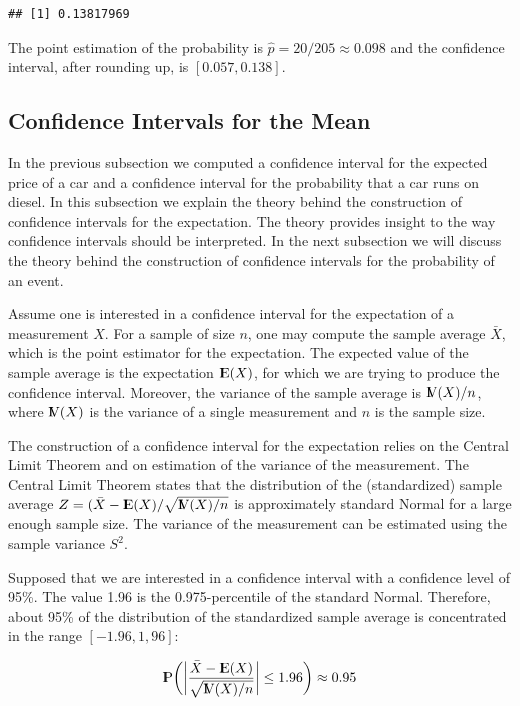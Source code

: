 \documentclass[]{krantz}
\newcommand{\Expec}{{\rm I\kern-.3em E}}
\newcommand{\Prob}{{\rm I\kern-.3em P}}
\newcommand{\Var}{{\rm I\kern-.3em V}}
\theoremstyle{definition}
\theoremstyle{definition}
\theoremstyle{definition}
\theoremstyle{remark}
\begin{document}
\begin{verbatim}
## [1] 0.13817969
\end{verbatim}

The point estimation of the probability is
\(\hat p = 20/205 \approx 0.098\) and the confidence interval, after
rounding up, is \([0.057, 0.138]\).

\hypertarget{subsec:CImean}{%
\subsection{Confidence Intervals for the Mean}\label{subsec:CImean}}

In the previous subsection we computed a confidence interval for the
expected price of a car and a confidence interval for the probability
that a car runs on diesel. In this subsection we explain the theory
behind the construction of confidence intervals for the expectation. The
theory provides insight to the way confidence intervals should be
interpreted. In the next subsection we will discuss the theory behind
the construction of confidence intervals for the probability of an
event.

Assume one is interested in a confidence interval for the expectation of
a measurement \(X\). For a sample of size \(n\), one may compute the sample
average \(\bar X\), which is the point estimator for the expectation. The
expected value of the sample average is the expectation \(\Expec(X)\), for
which we are trying to produce the confidence interval. Moreover, the
variance of the sample average is \(\Var(X)/n\), where \(\Var(X)\) is the
variance of a single measurement and \(n\) is the sample size.

The construction of a confidence interval for the expectation relies on
the Central Limit Theorem and on estimation of the variance of the
measurement. The Central Limit Theorem states that the distribution of
the (standardized) sample average \(Z = (\bar X - \Expec(X)/\sqrt{\Var(X)/n}\)
is approximately standard Normal for a large enough sample size. The variance of the measurement can be estimated using the sample variance \(S^2\).

Supposed that we are interested in a confidence interval with a
confidence level of 95\%. The value 1.96 is the 0.975-percentile of the
standard Normal. Therefore, about 95\% of the distribution of the
standardized sample average is concentrated in the range \([-1.96,1,96]\):

\[\Prob \bigg(\bigg|\frac{\bar X - \Expec(X)}{\sqrt{\Var(X)/n}}\bigg| \leq 1.96 \bigg) \approx 0.95\]
\end{document}
